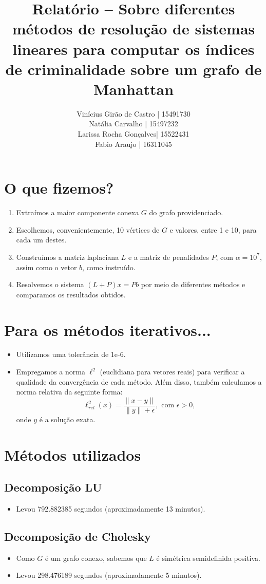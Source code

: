 \documentclass{article} %
\title{Relatório – Sobre diferentes métodos de resolução de sistemas lineares para computar os índices de criminalidade sobre um grafo de Manhattan}
\author
{
  Vinícius Girão de Castro | 15491730 \\
  Natália Carvalho | 15497232 \\
  Larissa Rocha Gonçalves| 15522431\\
  Fabio Araujo | 16311045 \\
}
\date{}
\theoremstyle{definition}
\begin{document}
\maketitle
    \section*{O que fizemos?}
        \begin{enumerate}
            \item Extraímos a maior componente conexa $G$ do grafo providenciado.
            \item Escolhemos, convenientemente, 10 vértices de $G$ e valores, entre 1 e 10, para cada um destes.
            \item Construímos a matriz laplaciana $L$ e a matriz de penalidades $P$, com $\alpha = 10^{7}$, assim como o vetor $b$, como instruído.
            \item Resolvemos o sistema  $\left( L + P \right)x = Pb $ por meio de diferentes métodos e comparamos os resultados obtidos.
        \end{enumerate}
    \section*{Para os métodos iterativos...    }
        \begin{itemize}
            \item Utilizamos uma tolerância de 1e-6.
            \item Empregamos a norma $\ell^2$ (euclidiana para vetores reais) para verificar a qualidade da convergência de cada método. Além disso, também calculamos a norma relativa da seguinte forma:
                $$\ell^2_{rel}(x) = \frac{\|x - y\|}{\|y\| + \epsilon }, \text{ com } \epsilon > 0,$$
                onde $y$ é a solução exata.
        \end{itemize}
    \section*{Métodos utilizados}
        \subsection*{Decomposição LU}
            \begin{itemize}
                \item Levou 792.882385 segundos (aproximadamente 13 minutos).
            \end{itemize}
        \subsection*{Decomposição de Cholesky}
            \begin{itemize}
                \item Como $G$ é um grafo conexo, sabemos que $L$ é simétrica semidefinida positiva.
                \item Levou 298.476189 segundos (aproximadamente 5 minutos).
            \end{itemize}
\end{document}
